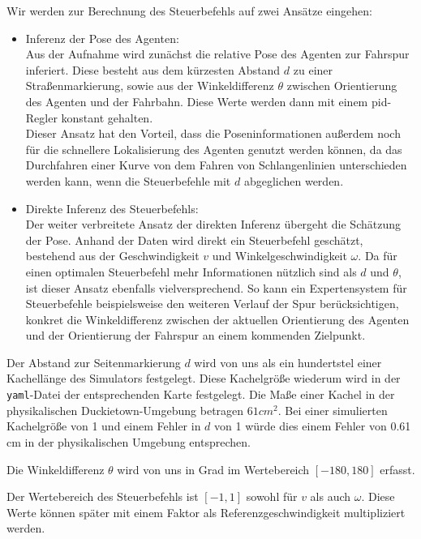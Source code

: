 Wir werden zur Berechnung des Steuerbefehls auf zwei Ansätze eingehen:

\begin{itemize}
	\item Inferenz der Pose des Agenten:\\
	Aus der Aufnahme wird zunächst die relative Pose des Agenten zur Fahrspur inferiert. Diese besteht aus dem kürzesten Abstand $d$ zu einer Straßenmarkierung, sowie aus der Winkeldifferenz $\theta$ zwischen Orientierung des Agenten und der Fahrbahn. Diese Werte werden dann mit einem \acs{pid}-Regler konstant gehalten.\\
	Dieser Ansatz hat den Vorteil, dass die Poseninformationen außerdem noch für die schnellere Lokalisierung des Agenten genutzt werden können, da das Durchfahren einer Kurve von dem Fahren von Schlangenlinien unterschieden werden kann, wenn die Steuerbefehle mit $d$ abgeglichen werden.
	\item Direkte Inferenz des Steuerbefehls:\\
	Der weiter verbreitete Ansatz der direkten Inferenz übergeht die Schätzung der Pose. Anhand der Daten wird direkt ein Steuerbefehl geschätzt, bestehend aus der Geschwindigkeit $v$ und Winkelgeschwindigkeit $\omega$. Da für einen optimalen Steuerbefehl mehr Informationen nützlich sind als $d$ und $\theta$, ist dieser Ansatz ebenfalls vielversprechend. So kann ein Expertensystem für Steuerbefehle beispielsweise den weiteren Verlauf der Spur berücksichtigen, konkret die Winkeldifferenz zwischen der aktuellen Orientierung des Agenten und der Orientierung der Fahrspur an einem kommenden Zielpunkt.
\end{itemize}

\newpage

Der Abstand zur Seitenmarkierung $d$ wird von uns als ein hundertstel einer Kachellänge des Simulators festgelegt. Diese Kachelgröße wiederum wird in der \texttt{yaml}-Datei der entsprechenden Karte festgelegt. Die Maße einer Kachel in der physikalischen Duckietown-Umgebung betragen $61 cm^2$. Bei einer simulierten Kachelgröße von 1 und einem Fehler in $d$ von 1 würde dies einem Fehler von 0.61 cm in der physikalischen Umgebung entsprechen.

Die Winkeldifferenz $\theta$ wird von uns in Grad im Wertebereich $[-180, 180]$ erfasst. 

Der Wertebereich des Steuerbefehls ist $[-1, 1]$ sowohl für $v$ als auch $\omega$. Diese Werte können später mit einem Faktor als Referenzgeschwindigkeit multipliziert werden.